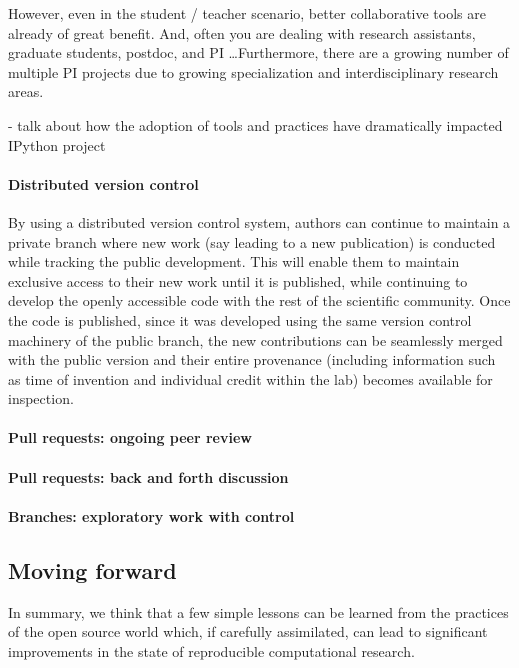 \documentclass[ChapterTOCs,krantz2]{krantz} %
\begin{document}
However, even in the student / teacher scenario, better collaborative tools
are already of great benefit.  And, often you are dealing with research
assistants, graduate students, postdoc, and PI \ldots  Furthermore, there are a
growing number of multiple PI projects due to growing specialization and
interdisciplinary research areas.

- talk about how the adoption of tools and practices have dramatically
impacted IPython project

\paragraph{ {\bf Distributed version control}}

By using a distributed version control system, authors can continue
to maintain a private branch where new work (say leading to a new
publication) is conducted while tracking the public development. This
will enable them to maintain exclusive access to their new work until
it is published, while continuing to develop the openly accessible
code with the rest of the scientific community. Once the code is published,
since it was developed using the same version control machinery of
the public branch, the new contributions can be seamlessly merged
with the public version and their entire provenance (including information
such as time of invention and individual credit within the lab) becomes
available for inspection.

\paragraph{ {\bf Pull requests: ongoing peer review}}

\paragraph{ {\bf Pull requests: back and forth discussion}}

\paragraph{ {\bf Branches: exploratory work with control}}


\subsection{Moving forward }

In summary, we think that a few simple lessons can be learned from
the practices of the open source world which, if carefully assimilated,
can lead to significant improvements in the state of reproducible
computational research. 
\end{document}
